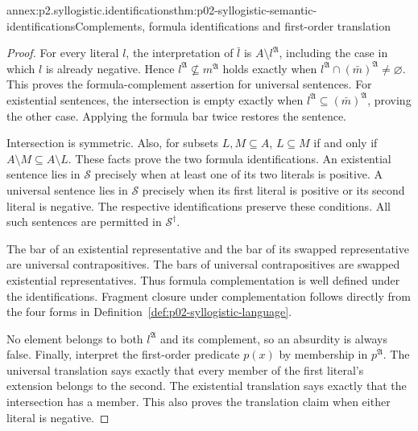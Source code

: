 \begin{annexitem}{annex:p2.syllogistic.identifications}{thm:p02-syllogistic-semantic-identifications}{Complements, formula identifications and first-order translation}
\begin{proof}
For every literal \(l\), the interpretation of \(\bar l\) is
\(A\setminus l^{\mathfrak A}\), including the case in which \(l\) is already
negative. Hence \(l^{\mathfrak A}\not\subseteq m^{\mathfrak A}\) holds
exactly when \(l^{\mathfrak A}\cap(\bar m)^{\mathfrak A}\ne\varnothing\).
This proves the formula-complement assertion for universal sentences.
For existential sentences, the intersection is empty exactly when
\(l^{\mathfrak A}\subseteq(\bar m)^{\mathfrak A}\), proving the other case.
Applying the formula bar twice restores the sentence.

Intersection is symmetric. Also, for subsets \(L,M\subseteq A\),
\(L\subseteq M\) if and only if \(A\setminus M\subseteq A\setminus L\).
These facts prove the two formula identifications. An existential sentence
lies in \(\mathcal S\) precisely when at least one of its two literals is
positive. A universal sentence lies in \(\mathcal S\) precisely when its
first literal is positive or its second literal is negative. The respective
identifications preserve these conditions. All such sentences are permitted
in \(\mathcal S^\dagger\).

The bar of an existential representative and the bar of its swapped
representative are universal contrapositives. The bars of universal
contrapositives are swapped existential representatives. Thus formula
complementation is well defined under the identifications. Fragment closure
under complementation follows directly from the four forms in
Definition~\ref{def:p02-syllogistic-language}.

No element belongs to both \(l^{\mathfrak A}\) and its complement, so an
absurdity is always false. Finally, interpret the first-order predicate
\(p(x)\) by membership in \(p^{\mathfrak A}\). The universal translation
says exactly that every member of the first literal's extension belongs to
the second. The existential translation says exactly that the intersection
has a member. This also proves the translation claim when either literal is
negative.
\end{proof}
\end{annexitem}


